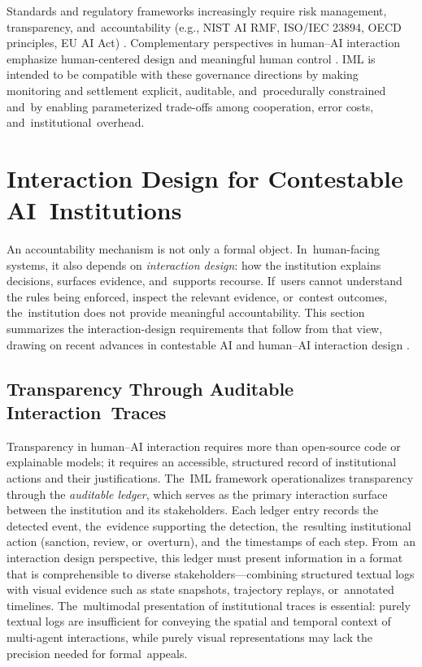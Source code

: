 \documentclass[mca,article,accept,pdftex,oneauthor]{Definitions/mdpi}
\begin{document}
Standards and regulatory frameworks increasingly require risk management, transparency, and~accountability (e.g., NIST AI RMF, ISO/IEC 23894, OECD principles, EU AI Act) \citep{NIST2023AIRMF,ISO23894,OECDAI2019,EU2024AIAct}. Complementary perspectives in human--AI interaction emphasize human-centered design and meaningful human control \citep{Shneiderman2020HCAI,Santoni2018MHC,Floridi2018AI4People}. IML is intended to be compatible with these governance directions by making monitoring and settlement explicit, auditable, and~procedurally constrained and~by enabling parameterized trade-offs among cooperation, error costs, and~institutional~overhead.

\section{Interaction Design for Contestable AI~Institutions}
\label{sec:interaction_design}

An accountability mechanism is not only a formal object. In~human-facing systems, it also depends on \emph{interaction design}: how the institution explains decisions, surfaces evidence, and~supports recourse. If~users cannot understand the rules being enforced, inspect the relevant evidence, or~contest outcomes, the~institution does not provide meaningful accountability. This section summarizes the interaction-design requirements that follow from that view, drawing on recent advances in contestable AI \citep{Lyons2021Contestability,Yurrita2025Contestability} and human--AI interaction design \citep{Zhao2025HumanAI}.

\subsection{Transparency Through Auditable Interaction~Traces}

Transparency in human--AI interaction requires more than open-source code or explainable models; it requires an accessible, structured record of institutional actions and their justifications. The~IML framework operationalizes transparency through the \emph{auditable ledger}, which serves as the primary interaction surface between the institution and its stakeholders. Each ledger entry records the detected event, the~evidence supporting the detection, the~resulting institutional action (sanction, review, or~overturn), and~the timestamps of each step. From~an interaction design perspective, this ledger must present information in a format that is comprehensible to diverse stakeholders---combining structured textual logs with visual evidence such as state snapshots, trajectory replays, or~annotated timelines. The~multimodal presentation of institutional traces is essential: purely textual logs are insufficient for conveying the spatial and temporal context of multi-agent interactions, while purely visual representations may lack the precision needed for formal~appeals.
\end{document}
